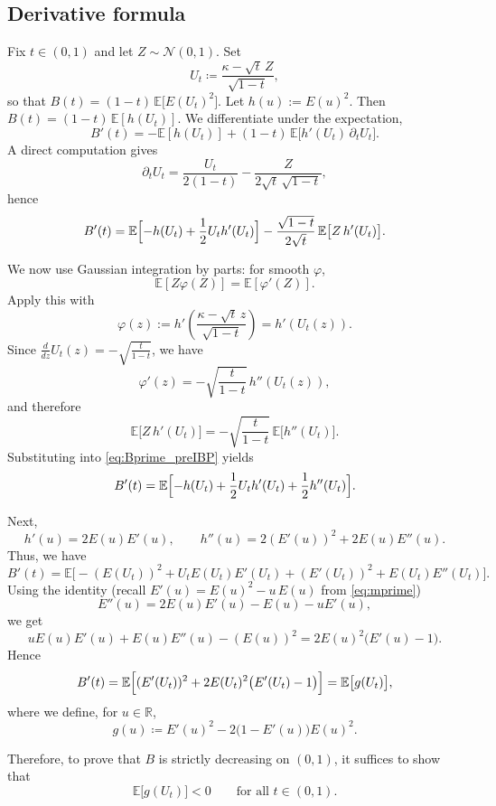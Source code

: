 \documentclass[11pt]{article}
\begin{document}
\subsection{Derivative formula}
Fix $t\in(0,1)$ and let $Z\sim\mathcal N(0,1)$. Set
\begin{equation}\label{eq:U-def}
U_t\coloneqq \frac{\kappa-\sqrt{t}\,Z}{\sqrt{1-t}},
\end{equation}
so that $B(t)=(1-t)\,\mathbb E\bigl[E(U_t)^2\bigr].$ 
Let $h(u):=E(u)^2$. Then $B(t)=(1-t)\,\mathbb E[h(U_t)]$. We differentiate under the expectation,
\[
B'(t)=-\mathbb E[h(U_t)]+(1-t)\,\mathbb E\bigl[h'(U_t)\,\partial_t U_t\bigr].
\]
A direct computation gives
\[
\partial_t U_t=\frac{U_t}{2(1-t)}-\frac{Z}{2\sqrt t\,\sqrt{1-t}},
\]
hence
\begin{equation}\label{eq:Bprime_preIBP}
B'(t)=\mathbb E\Bigl[-h(U_t)+\frac12 U_t h'(U_t)\Bigr]
-\frac{\sqrt{1-t}}{2\sqrt t}\,\mathbb E\bigl[Z\,h'(U_t)\bigr].
\end{equation}

We now use Gaussian integration by parts: for smooth $\varphi$,
\[
\mathbb E[Z\varphi(Z)]=\mathbb E[\varphi'(Z)].
\]
Apply this with
\[
\varphi(z):=h'\!\left(\frac{\kappa-\sqrt t\,z}{\sqrt{1-t}}\right)=h'(U_t(z)).
\]
Since $\frac{d}{dz}U_t(z)=-\sqrt{\frac{t}{1-t}}$, we have
\[
\varphi'(z)=-\sqrt{\frac{t}{1-t}}\,h''(U_t(z)),
\]
and therefore
\[
\mathbb E\bigl[Z\,h'(U_t)\bigr]
=-\sqrt{\frac{t}{1-t}}\,\mathbb E\bigl[h''(U_t)\bigr].
\]
Substituting into \eqref{eq:Bprime_preIBP} yields
\[
B'(t)=\mathbb E\Bigl[-h(U_t)+\frac12 U_t h'(U_t)+\frac12 h''(U_t)\Bigr].
\]

Next,
\[
h'(u)=2E(u)E'(u),\qquad
h''(u)=2(E'(u))^2+2E(u)E''(u).
\]
Thus, we have
\[
B'(t)= \mathbb{E}\Big[-(E(U_t))^2+U_t E(U_t)E'(U_t)+(E'(U_t))^2+E(U_t)E''(U_t)\Big].
\]
Using the identity (recall $E'(u)=E(u)^2-u\,E(u)$ from \eqref{eq:mprime})
\[
E''(u)=2E(u)E'(u)-E(u)-uE'(u),
\]
we get
\[
uE(u)E'(u)+E(u)E''(u)-(E(u))^2=2E(u)^2\bigl(E'(u)-1\bigr).
\]
Hence
\begin{equation}\label{eq:Bprime-TOBECHECKED}
    B'(t)=\mathbb E\Bigl[(E'(U_t))^2+2E(U_t)^2\bigl(E'(U_t)-1\bigr)\Bigr]
=\mathbb E\bigl[g(U_t)\bigr],
\end{equation}
 where we define, for $u\in\mathbb{R}$,
\begin{equation}\label{eq:g-def}
g(u)\coloneqq E'(u)^2-2\bigl(1-E'(u)\bigr)E(u)^2.
\end{equation}

Therefore, to prove that $B$ is strictly decreasing on $(0,1)$, it suffices to show that
\begin{equation}\label{eq:goal}
\mathbb{E}\bigl[g(U_t)\bigr]<0\qquad\text{for all }t\in(0,1).
\end{equation}
\end{document}
